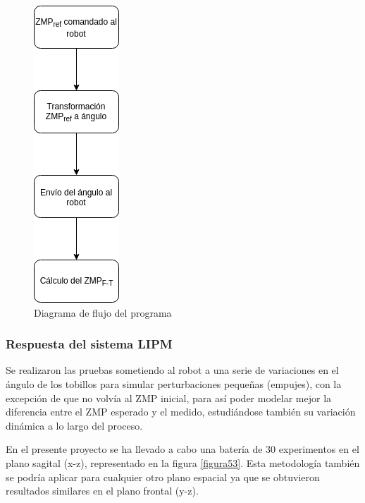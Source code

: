 \begin{figure}[H]
\centering
\includegraphics[scale=0.5]{imagenes/apartado_5/52_diagrama_flujo1}
\caption{Diagrama de flujo del programa}
\label{figura52}
\end{figure}


\subsubsection{Respuesta del sistema LIPM}

Se realizaron las pruebas sometiendo al robot a una serie de variaciones en el ángulo de los tobillos para simular perturbaciones pequeñas (empujes), con la excepción de que no volvía al ZMP inicial, para así poder modelar mejor la diferencia entre el ZMP esperado y el medido, estudiándose también su variación dinámica a lo largo del proceso. 

En el presente proyecto se ha llevado a cabo una batería de 30 experimentos en el plano sagital (x-z), representado en la figura \ref{figura53}. Esta metodología también se podría aplicar para cualquier otro plano espacial ya que se obtuvieron resultados similares en el plano frontal (y-z).


